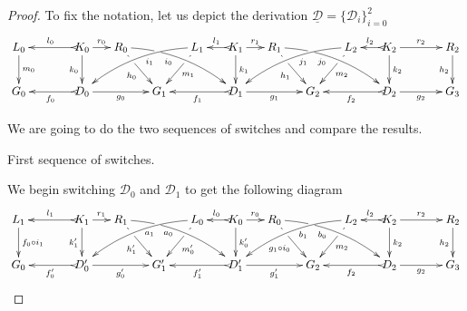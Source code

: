 \documentclass[a4paper,UKenglish,cleveref,pdftex,thm-restate,numberwithinsect]{lipics-v2021}
\def\G{\textbf {\textup{G}}}
\newcommand{\dder}[1]{\mathscr{#1}}
\newcommand{\der}[1]{\underline{\dder{#1}}}
\begin{document}
\lemSwitchConfluence*
\label{lemSwitchConfluence-proof}

\begin{proof}
	To fix the notation, let us depict the derivation $\der{D}=\{\dder{D}_i\}_{i=0}^2$
	\[\xymatrix@C=15pt{L_0\ar[d]^{m_0}&& K_0 \ar[d]_{k_0}\ar@{>->}[ll]_{l_0} \ar[r]^{r_0} & R_0 \ar@/^.35cm/[drrr]_(.4){i_0}|(.29)\hole \ar[dr]|(.28)\hole_{h_0} && L_1 \ar@/_.35cm/[dlll]^(.4){i_1} \ar[dl]|(.28)\hole^{m_1}& K_1 \ar[d]^{k_1}\ar@{>->}[l]_{l_1} \ar[r]^{r_1} & R_1 \ar[dr]|(.28)\hole_{h_1} \ar@/^.35cm/[drrr]_(.4){j_0}|(.29)\hole  && L_2 \ar@/_.35cm/[dlll]^(.4){j_1} \ar[dl]|(.28)\hole^{m_2}& K_2 \ar[d]^{k_2}\ar@{>->}[l]_{l_2} \ar[rr]^{r_2} && R_2 \ar[d]_{h_2} \\G_0 && \ar@{>->}[ll]^{f_0} D_0 \ar[rr]_{g_0}&& G_1  && \ar@{>->}[ll]^{f_1} D_1 \ar[rr]_{g_1}&& G_2 && \ar@{>->}[ll]^{f_2} D_2 \ar[rr]_{g_2}&& G_3 }\]
	
	We are going to do the two sequences of switches and compare the results.
	
	\smallskip \noindent First sequence of switches.
	
	We begin switching $\dder{D}_0$ and $\dder{D}_1$ to get the following diagram
	\[\xymatrix@C=15pt{L_1\ar[d]^{f_0\circ i_1}&& K_1 \ar[d]_{k'_1}\ar@{>->}[ll]_{l_1} \ar[r]^{r_1} & R_1 \ar@/^.35cm/[drrr]_(.4){a_0}|(.29)\hole \ar[dr]|(.28)\hole_{h'_1} && L_0 \ar@/_.35cm/[dlll]^(.4){a_1} \ar[dl]|(.28)\hole^{m'_0}& K_0 \ar[d]^{k'_0}\ar@{>->}[l]_{l_0} \ar[r]^{r_0} & R_0 \ar[dr]|(.28)\hole_{g_1\circ i_0} \ar@/^.35cm/[drrr]_(.4){b_0}|(.29)\hole  && L_2 \ar@/_.35cm/[dlll]^(.4){b_1} \ar[dl]|(.28)\hole^{m_2}& K_2 \ar[d]^{k_2}\ar@{>->}[l]_{l_2} \ar[rr]^{r_2} && R_2 \ar[d]_{h_2} \\G_0 && \ar@{>->}[ll]^{f'_0} D'_0 \ar[rr]_{g'_0}&& G'_1  && \ar@{>->}[ll]^{f'_1} D'_1 \ar[rr]_{g'_1}&& G_2 && \ar@{>->}[ll]^{f_2} D_2 \ar[rr]_{g_2}&& G_3 }\]


\end{proof}
\end{document}
